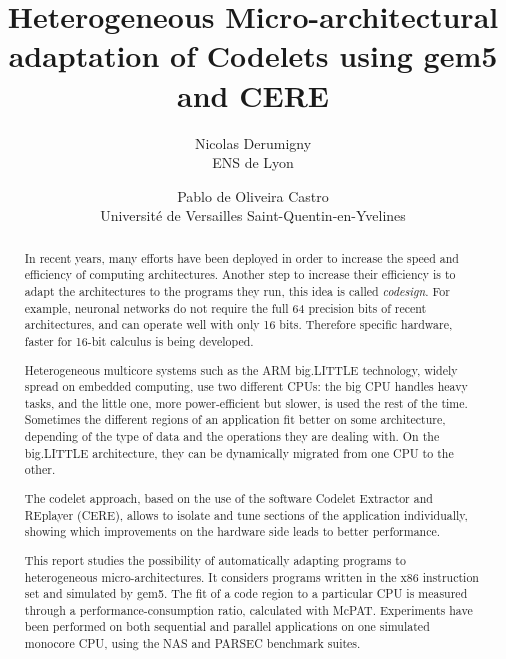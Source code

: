 \documentclass{article}
\title{Heterogeneous Micro-architectural adaptation of Codelets using gem5 and CERE}
\author{Nicolas Derumigny \\
\small ENS de Lyon 
\and Pablo de Oliveira Castro\\ 
\small Université de Versailles Saint-Quentin-en-Yvelines}
\date{}
\begin{document}
\maketitle

\smallskip

\begin{abstract}
In recent years, many efforts have been deployed in order to increase the speed and efficiency of computing architectures. Another step to increase their efficiency is to adapt the architectures to the programs they run, this idea is called \emph{codesign}. For example, neuronal networks do not require the full 64 precision bits of recent architectures, and can operate well with only 16 bits. Therefore specific hardware, faster for 16-bit calculus is being developed.


Heterogeneous multicore systems such as the ARM big.LITTLE technology, widely spread on embedded computing, use two different CPUs: the big CPU handles heavy tasks, and the little one, more power-efficient but slower, is used the rest of the time. Sometimes the different regions of an application fit better on some architecture, depending of the type of data and the operations they are dealing with. On the big.LITTLE architecture, they can be dynamically migrated from one CPU to the other. 

The codelet approach, based on the use of the software Codelet Extractor and REplayer (CERE), allows to isolate and tune sections of the application individually, showing which improvements on the hardware side leads to better performance. 


This report studies the possibility of automatically adapting programs to heterogeneous micro-architectures. It considers programs written in the x86 instruction set and simulated by gem5. The fit of a code region to a particular CPU is measured through a performance-consumption ratio, calculated with McPAT.
Experiments have been performed on both sequential and parallel applications on one simulated monocore CPU, using the NAS and PARSEC benchmark suites. 

\end{abstract}
\end{document}
